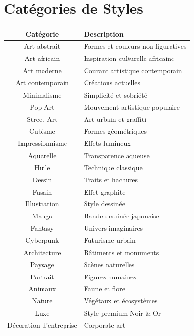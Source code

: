 \documentclass[12pt,a4paper,oneside]{book}
\begin{document}
\section{Catégories de Styles}
\begin{center}
\begin{tabular}{|c|p{10cm}|}
\hline
\rowcolor{electronpurple}
\color{white}\textbf{Catégorie} & \color{white}\textbf{Description} \\
\hline
Art abstrait & Formes et couleurs non figuratives \\
\hline
Art africain & Inspiration culturelle africaine \\
\hline
Art moderne & Courant artistique contemporain \\
\hline
Art contemporain & Créations actuelles \\
\hline
Minimalisme & Simplicité et sobriété \\
\hline
Pop Art & Mouvement artistique populaire \\
\hline
Street Art & Art urbain et graffiti \\
\hline
Cubisme & Formes géométriques \\
\hline
Impressionnisme & Effets lumineux \\
\hline
Aquarelle & Transparence aqueuse \\
\hline
Huile & Technique classique \\
\hline
Dessin & Traits et hachures \\
\hline
Fusain & Effet graphite \\
\hline
Illustration & Style dessinée \\
\hline
Manga & Bande dessinée japonaise \\
\hline
Fantasy & Univers imaginaires \\
\hline
Cyberpunk & Futurisme urbain \\
\hline
Architecture & Bâtiments et monuments \\
\hline
Paysage & Scènes naturelles \\
\hline
Portrait & Figures humaines \\
\hline
Animaux & Faune et flore \\
\hline
Nature & Végétaux et écosystèmes \\
\hline
Luxe & Style premium Noir \& Or \\
\hline
Décoration d'entreprise & Corporate art \\
\hline
\end{tabular}
\end{center}
\end{document}
